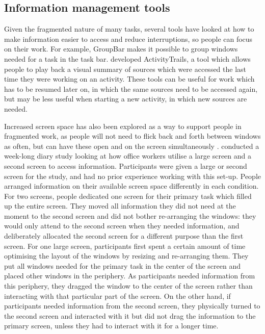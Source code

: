 \subsection{Information management tools}
Given the fragmented nature of many tasks, several tools have looked at how to make information easier to access and reduce interruptions, so people can focus on their work. For example, GroupBar \citep{Smith2003} makes it possible to group windows needed for a task in the task bar. \citet{Cangiano2009} developed ActivityTrails, a tool which allows people to play back a visual summary of sources which were accessed the last time they were working on an activity.  These tools can be useful for work which has to be resumed later on, in which the same sources need to be accessed again, but may be less useful when starting a new activity, in which new sources are needed.

Increased screen space has also been explored as a way to support people in fragmented work, as people will not need to flick back and forth between windows as often, but can have these open and on the screen simultaneously \citep{Czerwinski2003}.  \citet{Bi2009} conducted a week-long diary study looking at how office workers utilise a large screen and a second screen to access information. Participants were given a large or second screen for the study, and had no prior experience working with this set-up. People arranged information on their available screen space differently in each condition. For two screens, people dedicated one screen for their primary task which filled up the entire screen. They moved all information they did not need at the moment to the second screen and did not bother re-arranging the windows: they would only attend to the second screen when they needed information, and deliberately allocated the second screen for a different purpose than the first screen. For one large screen, participants first spent a certain amount of time optimising the layout of the windows by resizing and re-arranging them. They put all windows needed for the primary task in the center of the screen and placed other windows in the periphery.  As participants needed information from this periphery, they dragged the window to the center of the screen rather than interacting with that particular part of the screen. On the other hand, if participants needed information from the second screen, they physically turned to the second screen and interacted with it but did not drag the information to the primary screen, unless they had to interact with it for a longer time.

